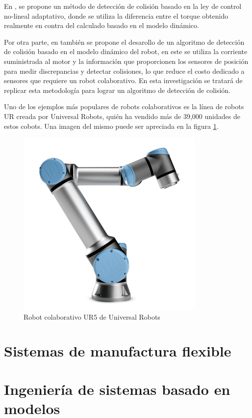 En \cite{Matsumotoa}, se propone un método de detección de colisión basado en la ley de control no-lineal adaptativo, donde se utiliza la diferencia entre el torque obtenido realmente en contra del calculado basado en el modelo dinámico.

Por otra parte, en \cite{Chen2018} también se propone el desarollo de un algoritmo de detección de colisión basado en el modelo dinámico del robot, en este se utiliza la corriente suministrada al motor y la información que proporcionen los sensores de posición para medir discrepancias y detectar colisiones, lo que reduce el costo dedicado a sensores que requiere un robot colaborativo. En esta investigación se tratará de replicar esta metodología para lograr un algoritmo de detección de colisión.

Uno de los ejemplos más populares de robots colaborativos es la línea de robots UR creada por Universal Robots, quién ha vendido más de 39,000 unidades de estos cobots. Una imagen del mismo puede ser apreciada en la figura \ref{fig:ur5}.

\begin{figure}
    \centering
    \includegraphics[scale=0.5]{./img/chapter2/ur5.png}
    \caption{Robot colaborativo UR5 de Universal Robots}
    \label{fig:ur5}
\end{figure}

\section{Sistemas de manufactura flexible}
\section{Ingeniería de sistemas basado en modelos}
